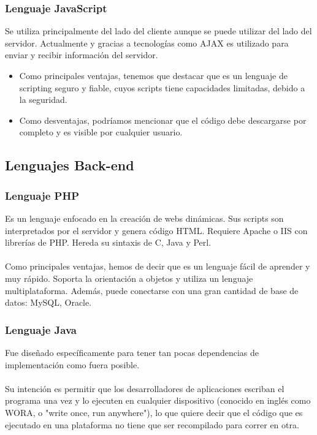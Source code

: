 \begin{large}
\subsubsection{Lenguaje JavaScript}

Se utiliza principalmente del lado del cliente aunque se puede utilizar del lado del servidor. Actualmente y gracias a tecnologías como AJAX es utilizado para enviar y recibir información del servidor.

\begin{itemize}
    \item Como principales ventajas, tenemos que destacar que es un lenguaje de scripting seguro y fiable, cuyos scripts tiene capacidades limitadas, debido a la seguridad.
    \item Como desventajas, podríamos mencionar que el código debe descargarse por completo y es visible por cualquier usuario.
\end{itemize} \leavevmode

\subsection{Lenguajes Back-end}

\subsubsection{Lenguaje PHP}

Es un lenguaje enfocado en la creación de webs dinámicas. Sus scripts son interpretados por el servidor y genera código HTML. Requiere Apache o IIS con librerías de PHP. Hereda su sintaxis de C, Java y Perl.
\\
\\
Como principales ventajas, hemos de decir que es un lenguaje fácil de aprender y muy rápido. Soporta la orientación a objetos  y utiliza un lenguaje multiplataforma. Además, puede conectarse con una gran cantidad de base de datos: MySQL, Oracle.
\\
\subsubsection{Lenguaje Java}

Fue diseñado específicamente para tener tan pocas dependencias de implementación como fuera posible. 
\\
\\
Su intención es permitir que los desarrolladores de aplicaciones escriban el programa una vez y lo ejecuten en cualquier dispositivo (conocido en inglés como WORA, o "write once, run anywhere"), lo que quiere decir que el código que es ejecutado en una plataforma no tiene que ser recompilado para correr en otra.
\\


\end{large}
